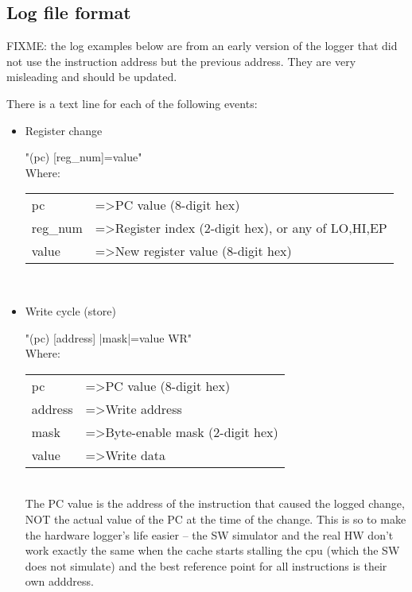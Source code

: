 \documentclass[11pt]{article}
\begin{document}
\subsection{Log file format}
\label{log_file_format}

    FIXME: the log examples below are from an early version of the logger that
    did not use the instruction address but the previous address. They are very
    misleading and should be updated.

    There is a text line for each of the following events:

    \begin{itemize}
    \item Register change

        "(pc) [reg\_num]=value"\\

        Where:
            
        \begin{tabular}{ l l }
            pc       & =\textgreater PC value (8-digit hex)\\
            reg\_num & =\textgreater Register index (2-digit hex), or any of {LO,HI,EP}\\
            value    & =\textgreater New register value (8-digit hex)\\
        \end{tabular}\\
       

    \item Write cycle (store)

        "(pc) [address] |mask|=value WR"\\

        Where:
        
        \begin{tabular}{ l l }
        pc      & =\textgreater PC value (8-digit hex)\\
        address & =\textgreater Write address\\
        mask    & =\textgreater Byte-enable mask (2-digit hex)\\
        value   & =\textgreater Write data\\
        \end{tabular}\\

        The PC value is the address of the instruction that caused the logged
        change, NOT the actual value of the PC at the time of the change. 
        This is so to make the hardware logger's life easier -- the SW simulator
        and the real HW don't work exactly the same when the cache starts 
        stalling the cpu (which the SW does not simulate) and the best reference
        point for all instructions is their own adddress.


\end{itemize}
\end{document}
